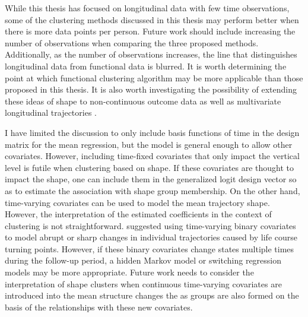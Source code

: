 While this thesis has focused on longitudinal data with few time observations, some of the clustering methods discussed in this thesis may perform better when there is more data points per person. Future work should include increasing the number of observations when comparing the three proposed methods. Additionally, as the number of observations increases, the line that distinguishes longitudinal data from functional data is blurred. It is worth determining the point at which functional clustering algorithm may be more applicable than those proposed in this thesis. It is also worth investigating the possibility of extending these ideas of shape to non-continuous outcome data \cite{jones2001} as well as multivariate longitudinal trajectories \cite{jones2007,d2000}.

I have limited the discussion to only include basis functions of time in the design matrix for the mean regression, but the model is general enough to allow other covariates. However, including time-fixed covariates that only impact the vertical level is futile when clustering based on shape. If these covariates are thought to impact the shape, one can include them in the generalized logit design vector so as to estimate the association with shape group membership. On the other hand, time-varying covariates can be used to model the mean trajectory shape. However, the interpretation of the estimated coefficients in the context of clustering is not straightforward. \Textcite{nagin2003} suggested using time-varying binary covariates to model abrupt or sharp changes in individual trajectories caused by life course turning points. However, if these binary covariates change states multiple times during the follow-up period, a hidden Markov model or switching regression models \cite{quandt1972} may be more appropriate. Future work needs to consider the interpretation of shape clusters when continuous time-varying covariates are introduced into the mean structure changes the  as groups are also formed on the basis of the relationships with these new covariates. 

